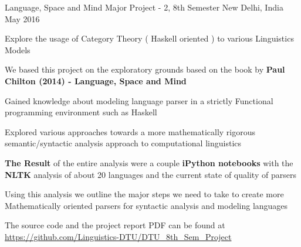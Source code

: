 \begin{cventries}
 \cventry
    {Language, Space and Mind}
    {Major Project - 2, 8th Semester }
    {New Delhi, India }
    {May 2016}
    {
      \begin{cvitems}
        \item {Explore the usage of Category Theory ( Haskell oriented ) to various Linguistics Models }
        \item {We based this project on the exploratory grounds based on the book by \textbf{Paul Chilton (2014) - Language, Space and Mind}}    
		\item {Gained knowledge about modeling language parser in a strictly Functional programming environment such as Haskell} 
		\item {Explored various approaches towards a more mathematically rigorous semantic/syntactic analysis approach to computational linguistics}         
        \item{\textbf{The Result} of the entire analysis were a couple \textbf{iPython notebooks} with the \textbf{NLTK} analysis of about 20 languages and the current state of quality of parsers}
    	\item{Using this analysis we outline the major steps we need to take to create more Mathematically oriented parsers for syntactic analysis and modeling languages}    
        \item{The source code and the project report PDF can be found at \\ \url{https://github.com/Linguistics-DTU/DTU_8th_Sem_Project}}
      \end{cvitems}
    }


\end{cventries}
